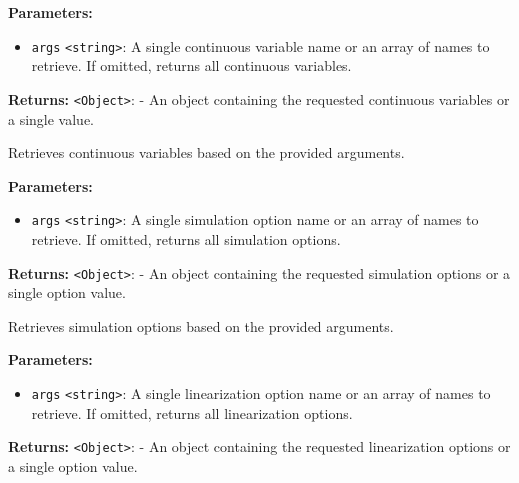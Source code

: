 \documentclass[12pt,a4paper]{article}
\begin{document}
\vspace{5mm}
\noindent {}


\noindent \textbf{Parameters:}
\begin{itemize}
  \item \texttt{args} \texttt{<string>}: A single continuous variable name or an array of names to retrieve. If omitted, returns all continuous variables.
\end{itemize}

\noindent \textbf{Returns:} \texttt{<Object>}: - An object containing the requested continuous variables or a single value.

\noindent Retrieves continuous variables based on the provided arguments.

\vspace{5mm}
\noindent {}


\noindent \textbf{Parameters:}
\begin{itemize}
  \item \texttt{args} \texttt{<string>}: A single simulation option name or an array of names to retrieve. If omitted, returns all simulation options.
\end{itemize}

\noindent \textbf{Returns:} \texttt{<Object>}: - An object containing the requested simulation options or a single option value.

\noindent Retrieves simulation options based on the provided arguments.

\vspace{5mm}
\noindent {}


\noindent \textbf{Parameters:}
\begin{itemize}
  \item \texttt{args} \texttt{<string>}: A single linearization option name or an array of names to retrieve. If omitted, returns all linearization options.
\end{itemize}

\noindent \textbf{Returns:} \texttt{<Object>}: - An object containing the requested linearization options or a single option value.
\end{document}
